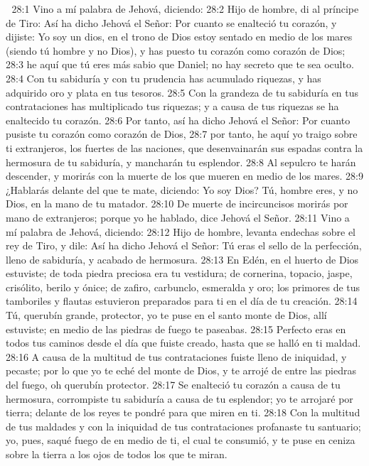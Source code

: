 
28:1 Vino a mí palabra de Jehová, diciendo:  
28:2 Hijo de hombre, di al príncipe de Tiro: Así ha dicho Jehová el Señor: Por cuanto se enalteció tu corazón, y dijiste: Yo soy un dios, en el trono de Dios estoy sentado en medio de los mares (siendo tú hombre y no Dios), y has puesto tu corazón como corazón de Dios;  
28:3 he aquí que tú eres más sabio que Daniel; no hay secreto que te sea oculto.  
28:4 Con tu sabiduría y con tu prudencia has acumulado riquezas, y has adquirido oro y plata en tus tesoros.  
28:5 Con la grandeza de tu sabiduría en tus contrataciones has multiplicado tus riquezas; y a causa de tus riquezas se ha enaltecido tu corazón.  
28:6 Por tanto, así ha dicho Jehová el Señor: Por cuanto pusiste tu corazón como corazón de Dios,  
28:7 por tanto, he aquí yo traigo sobre ti extranjeros, los fuertes de las naciones, que desenvainarán sus espadas contra la hermosura de tu sabiduría, y mancharán tu esplendor.  
28:8 Al sepulcro te harán descender, y morirás con la muerte de los que mueren en medio de los mares.  
28:9 ¿Hablarás delante del que te mate, diciendo: Yo soy Dios? Tú, hombre eres, y no Dios, en la mano de tu matador.  
28:10 De muerte de incircuncisos morirás por mano de extranjeros; porque yo he hablado, dice Jehová el Señor.  
28:11 Vino a mí palabra de Jehová, diciendo:  
28:12 Hijo de hombre, levanta endechas sobre el rey de Tiro, y dile: Así ha dicho Jehová el Señor: Tú eras el sello de la perfección, lleno de sabiduría, y acabado de hermosura.  
28:13 En Edén, en el huerto de Dios estuviste; de toda piedra preciosa era tu vestidura; de cornerina, topacio, jaspe, crisólito, berilo y ónice; de zafiro, carbunclo, esmeralda y oro; los primores de tus tamboriles y flautas estuvieron preparados para ti en el día de tu creación.  
28:14 Tú, querubín grande, protector, yo te puse en el santo monte de Dios, allí estuviste; en medio de las piedras de fuego te paseabas.  
28:15 Perfecto eras en todos tus caminos desde el día que fuiste creado, hasta que se halló en ti maldad.  
28:16 A causa de la multitud de tus contrataciones fuiste lleno de iniquidad, y pecaste; por lo que yo te eché del monte de Dios, y te arrojé de entre las piedras del fuego, oh querubín protector.  
28:17 Se enalteció tu corazón a causa de tu hermosura, corrompiste tu sabiduría a causa de tu esplendor; yo te arrojaré por tierra; delante de los reyes te pondré para que miren en ti.  
28:18 Con la multitud de tus maldades y con la iniquidad de tus contrataciones profanaste tu santuario; yo, pues, saqué fuego de en medio de ti, el cual te consumió, y te puse en ceniza sobre la tierra a los ojos de todos los que te miran.  
